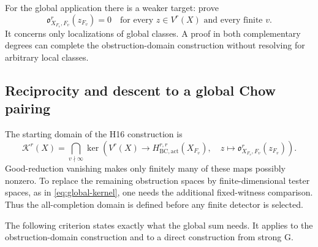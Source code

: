 \documentclass[11pt]{article}
\theoremstyle{definition}
\numberwithin{equation}{section}
\newcommand{\Ob}{\mathfrak o}
\begin{document}
For the global application there is a weaker target: prove
\begin{equation}\label{eq:programme-global-vanishing}
 \Ob^r_{X_{F_v},F_v}(z_{F_v})=0
 \quad\text{for every }z\in V^r(X)
 \text{ and every finite }v.
\end{equation}
It concerns only localizations of global classes. A proof in both complementary degrees can complete the obstruction-domain construction without resolving  for arbitrary local classes.

\subsection{Reciprocity and descent to a global Chow pairing}\label{sec:programme-global}

The starting domain of the H16 construction is
\begin{equation}\label{eq:programme-all-completion}
 \mathcal K^r(X)=
 \bigcap_{v\nmid\infty}
 \ker\!\left(V^r(X)\longrightarrow
    H^{r,r}_{\mathrm{BC,act}}(X_{F_v}),\quad
    z\longmapsto\Ob^r_{X_{F_v},F_v}(z_{F_v})\right).
\end{equation}
Good-reduction vanishing makes only finitely many of these maps possibly nonzero. To replace the remaining obstruction spaces by finite-dimensional tester spaces, as in \eqref{eq:global-kernel}, one needs the additional fixed-witness comparison. Thus the all-completion domain is defined before any finite detector is selected.

The following criterion states exactly what the global sum needs. It applies to the obstruction-domain construction and to a direct construction from strong G.
\end{document}
